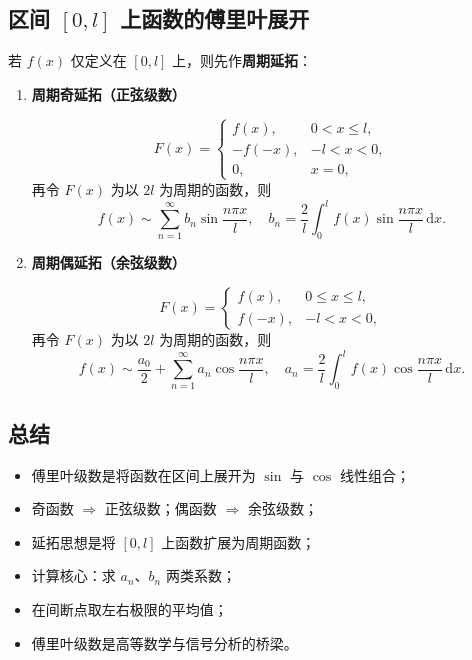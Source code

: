 \subsection{区间 $[0,l]$ 上函数的傅里叶展开}

若 $f(x)$ 仅定义在 $[0,l]$ 上，则先作\textbf{周期延拓}：

\begin{enumerate}
    \item \textbf{周期奇延拓（正弦级数）}

          \[
              F(x) =
              \begin{cases}
                  f(x),   & 0 < x \le l, \\
                  -f(-x), & -l < x < 0,  \\
                  0,      & x = 0,
              \end{cases}
          \]
          再令 $F(x)$ 为以 $2l$ 为周期的函数，则
          \[
              f(x) \sim \sum_{n=1}^{\infty} b_n \sin\frac{n\pi x}{l},
              \quad b_n = \frac{2}{l}\int_0^l f(x)\sin\frac{n\pi x}{l}\,\mathrm{d}x.
          \]

    \item \textbf{周期偶延拓（余弦级数）}

          \[
              F(x) =
              \begin{cases}
                  f(x),  & 0 \le x \le l, \\
                  f(-x), & -l < x < 0,
              \end{cases}
          \]
          再令 $F(x)$ 为以 $2l$ 为周期的函数，则
          \[
              f(x) \sim \frac{a_0}{2}
              + \sum_{n=1}^{\infty} a_n \cos\frac{n\pi x}{l},
              \quad a_n = \frac{2}{l}\int_0^l f(x)\cos\frac{n\pi x}{l}\,\mathrm{d}x.
          \]
\end{enumerate}

\subsection{总结}

\begin{itemize}
    \item 傅里叶级数是将函数在区间上展开为 $\sin$ 与 $\cos$ 线性组合；
    \item 奇函数 $\Rightarrow$ 正弦级数；偶函数 $\Rightarrow$ 余弦级数；
    \item 延拓思想是将 $[0,l]$ 上函数扩展为周期函数；
    \item 计算核心：求 $a_n$、$b_n$ 两类系数；
    \item 在间断点取左右极限的平均值；
    \item 傅里叶级数是高等数学与信号分析的桥梁。
\end{itemize}